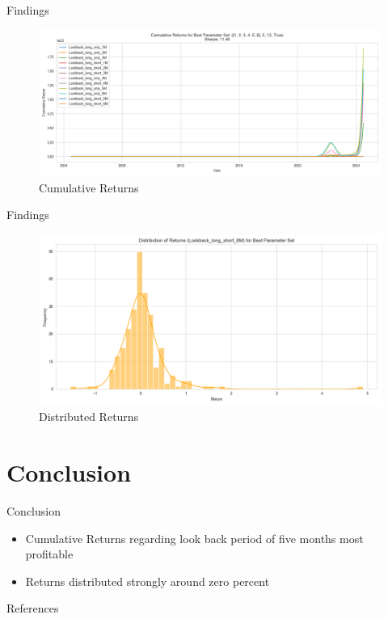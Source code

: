 \documentclass{beamer}
\begin{document}
\begin{frame}{Findings}
\begin{figure}
    \centering
    \includegraphics[width=1.05\linewidth]{Graphics/cumulative_returns_best_parameters.png}
    \caption{Cumulative Returns}
    \label{fig:enter-label}
\end{figure}
\end{frame}

\begin{frame}{Findings}
\begin{figure}
    \centering
    \includegraphics[width=1\linewidth]{Graphics/return_distribution.png}
    \caption{Distributed Returns}
    \label{fig:enter-label}
\end{figure}
\end{frame}

\section{Conclusion}
\begin{frame}{Conclusion}
\begin{itemize}
    \item Cumulative Returns regarding look back period of five months most profitable
    \item Returns distributed strongly around zero percent
\end{itemize}
\end{frame}


\begin{frame}{References}
    \printbibliography
\end{frame}
\end{document}
